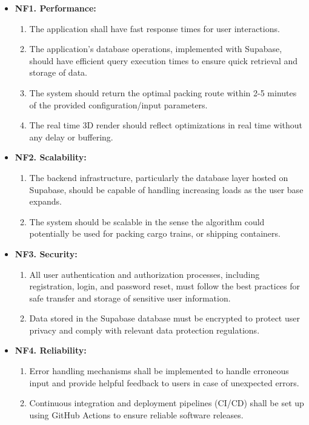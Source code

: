 \documentclass{article}
\begin{document}
\begin{itemize}
    \item \textbf{NF1. Performance:}
    \begin{enumerate}[label=1.\arabic*.]
        \item The application shall have fast response times for user interactions.
        \item The application's database operations, implemented with Supabase, should have efficient query execution times to ensure quick retrieval and storage of data.
        \item The system should return the optimal packing route within 2-5 minutes of the provided configuration/input parameters.
        \item The real time 3D render should reflect optimizations in real time without any delay or buffering.
    \end{enumerate}
    \item \textbf{NF2. Scalability:}
    \begin{enumerate}[label=2.\arabic*.]
        \item The backend infrastructure, particularly the database layer hosted on Supabase, should be capable of handling increasing loads as the user base expands.
        \item The system should be scalable in the sense the algorithm could potentially be used for packing cargo trains, or shipping containers.
    \end{enumerate}
    \item \textbf{NF3. Security:}
    \begin{enumerate}[label=3.\arabic*.]
        \item All user authentication and authorization processes, including registration, login, and password reset, must follow the best practices for safe transfer and storage of sensitive user information.
        \item Data stored in the Supabase database must be encrypted to protect user privacy and comply with relevant data protection regulations.
    \end{enumerate}
    \item \textbf{NF4. Reliability:}
    \begin{enumerate}[label=4.\arabic*.]
        \item Error handling mechanisms shall be implemented to handle erroneous input and provide helpful feedback to users in case of unexpected errors.
        \item Continuous integration and deployment pipelines (CI/CD) shall be set up using GitHub Actions to ensure reliable software releases.

\end{enumerate}
\end{itemize}
\end{document}
